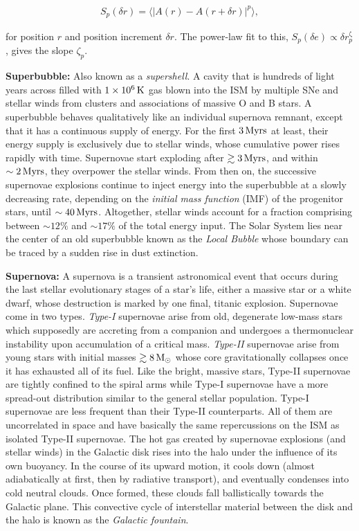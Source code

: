\documentclass[a4paper,10pt]{article}
\begin{document}
\begin{align*}
    S_p(\delta r) = \langle\lvert A(r)-A(r+\delta r)\rvert^p\rangle,
\end{align*}

{\noindent}for position $r$ and position increment $\delta r$. The power-law fit to this, $S_p(\delta e)\propto\delta r^{\upzeta}_p$, gives the slope $\zeta_p$.

{\noindent}\textbf{Superbubble:} Also known as a \textit{supershell}. A cavity that is hundreds of light years across filled with $1\times10^6\,{\rm K}$ gas blown into the ISM by multiple SNe and stellar winds from clusters and associations of massive O and B stars. A superbubble behaves qualitatively like an individual supernova remnant, except that it has a continuous supply of energy. For the first $3\,{\rm Myrs}$ at least, their energy supply is exclusively due to stellar winds, whose cumulative power rises rapidly with time. Supernovae start exploding after $\gtrsim3\,{\rm Myrs}$, and within $\sim2\,{\rm Myrs}$, they overpower the stellar winds. From then on, the successive supernovae explosions continue to inject energy into the superbubble at a slowly decreasing rate, depending on the \textit{initial mass function} (IMF) of the progenitor stars, until $\sim40\,{\rm Myrs}$. Altogether, stellar winds account for a fraction comprising between $\sim12\%$ and $\sim17\%$ of the total energy input. The Solar System lies near the center of an old superbubble known as the \textit{Local Bubble} whose boundary can be traced by a sudden rise in dust extinction.

{\noindent}\textbf{Supernova:} A supernova is a transient astronomical event that occurs during the last stellar evolutionary stages of a star's life, either a massive star or a white dwarf, whose destruction is marked by one final, titanic explosion. Supernovae come in two types. \textit{Type-I} supernovae arise from old, degenerate low-mass stars which supposedly are accreting from a companion and undergoes a thermonuclear instability upon accumulation of a critical mass. \textit{Type-II} supernovae arise from young stars with initial masses $\gtrsim8\,{\rm M}_\odot$ whose core gravitationally collapses once it has exhausted all of its fuel. Like the bright, massive stars, Type-II supernovae are tightly confined to the spiral arms while Type-I supernovae have a more spread-out distribution similar to the general stellar population. Type-I supernovae are less frequent than their Type-II counterparts. All of them are uncorrelated in space and have basically the same repercussions on the ISM as isolated Type-II supernovae. The hot gas created by supernovae explosions (and stellar winds) in the Galactic disk rises into the halo under the influence of its own buoyancy. In the course of its upward motion, it cools down (almost adiabatically at first, then by radiative transport), and eventually condenses into cold neutral clouds. Once formed, these clouds fall ballistically towards the Galactic plane. This convective cycle of interstellar material between the disk and the halo is known as the \textit{Galactic fountain}.
\end{document}
